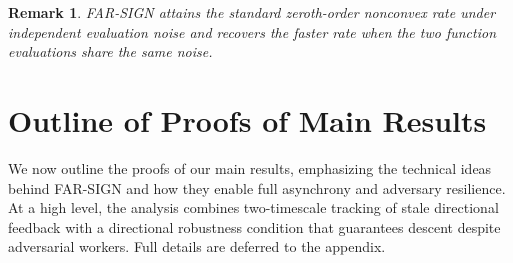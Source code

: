 \documentclass{article}
\newtheorem{remark}[theorem]{Remark}
\DeclareMathOperator*{\sign}{sign}
\newcommand{\farsign}{FAR-SIGN\xspace}
\newcommand{\cA}{\mathcal{A}}
\begin{document}
\begin{remark}
    \farsign attains the standard zeroth-order nonconvex rate under independent evaluation noise and recovers the faster rate when the two function evaluations share the same noise.
\end{remark}


\section{Outline of Proofs of Main Results}
%
\label{sec:3}

We now outline the proofs of our main results, emphasizing the technical ideas
behind \farsign{} and how they enable full asynchrony and adversary resilience.
At a high level, the analysis combines two-timescale tracking of stale
directional feedback with a directional robustness condition that guarantees
descent despite adversarial workers. Full details are deferred to the appendix.



\end{document}

